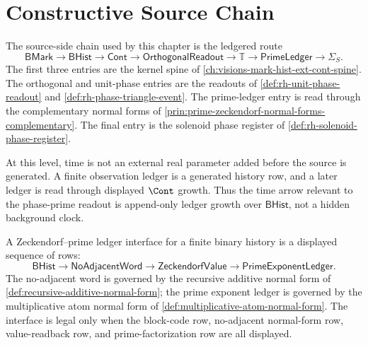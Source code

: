 \section{Constructive Source Chain}
\label{sec:rh-phase-triangle-constructive-source-chain}

\begin{definition}
\label{def:rh-distinction-to-phase-source-chain}
The source-side chain used by this chapter is the ledgered route
$$
\mathsf{BMark}
\to
\mathsf{BHist}
\to
\mathsf{Cont}
\to
\mathsf{OrthogonalReadout}
\to
\mathbb T
\to
\mathsf{PrimeLedger}
\to
\Sigma_S.
$$
The first three entries are the kernel spine of
\autoref{ch:visions-mark-hist-ext-cont-spine}. The orthogonal and
unit-phase entries are the readouts of
\autoref{def:rh-unit-phase-readout} and
\autoref{def:rh-phase-triangle-event}. The prime-ledger entry is read
through the complementary normal forms of
\autoref{prin:prime-zeckendorf-normal-forms-complementary}. The final
entry is the solenoid phase register of
\autoref{def:rh-solenoid-phase-register}.
\end{definition}

\begin{principle}
\label{prin:rh-observation-time-continuation-growth}
At this level, time is not an external real parameter added before the
source is generated. A finite observation ledger is a generated history
row, and a later ledger is read through displayed $\Cont$ growth. Thus
the time arrow relevant to the phase-prime readout is append-only
ledger growth over $\mathsf{BHist}$, not a hidden background clock.
\end{principle}

\begin{definition}
\label{def:rh-zeckendorf-prime-ledger-interface}
A Zeckendorf--prime ledger interface for a finite binary history is a
displayed sequence of rows:
$$
\mathsf{BHist}
\to
\mathsf{NoAdjacentWord}
\to
\mathsf{ZeckendorfValue}
\to
\mathsf{PrimeExponentLedger}.
$$
The no-adjacent word is governed by the recursive additive normal form of
\autoref{def:recursive-additive-normal-form}; the prime exponent ledger
is governed by the multiplicative atom normal form of
\autoref{def:multiplicative-atom-normal-form}. The interface is legal
only when the block-code row, no-adjacent normal-form row,
value-readback row, and prime-factorization row are all displayed.
\end{definition}

